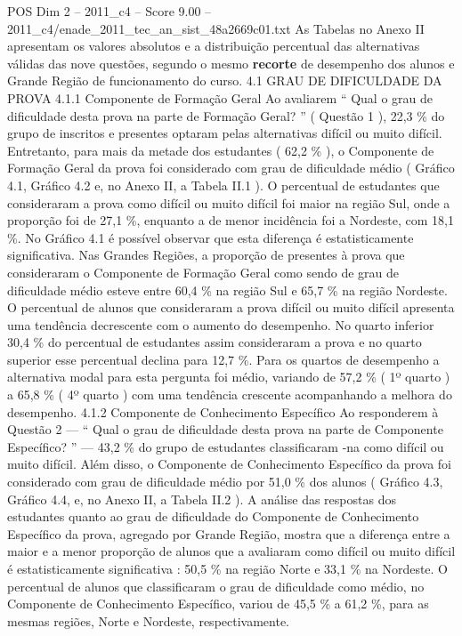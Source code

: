 \begin{textsample}{POS Dim 2 – 2011\_c4 – Score 9.00 – 2011\_c4/enade\_2011\_tec\_an\_sist\_48a2669c01.txt}
As Tabelas no Anexo II apresentam os valores absolutos e a distribuição percentual das alternativas válidas das nove questões, segundo o mesmo \textbf{recorte} de desempenho dos alunos e Grande Região de funcionamento do curso. 4.1 GRAU DE DIFICULDADE DA PROVA 4.1.1 Componente de Formação Geral Ao avaliarem “ Qual o grau de dificuldade desta prova na parte de Formação Geral? ” ( Questão 1 ), 22,3 \% do grupo de inscritos e presentes optaram pelas alternativas difícil ou muito difícil.
Entretanto, para mais da metade dos estudantes ( 62,2 \% ), o Componente de Formação Geral da prova foi considerado com grau de dificuldade médio ( Gráfico 4.1, Gráfico 4.2 e, no Anexo II, a Tabela II.1 ).
O percentual de estudantes que consideraram a prova como difícil ou muito difícil foi maior na região Sul, onde a proporção foi de 27,1 \%, enquanto a de menor incidência foi a Nordeste, com 18,1 \%.
No Gráfico 4.1 é possível observar que esta diferença é estatisticamente significativa.
Nas Grandes Regiões, a proporção de presentes à prova que consideraram o Componente de Formação Geral como sendo de grau de dificuldade médio esteve entre 60,4 \% na região Sul e 65,7 \% na região Nordeste.
O percentual de alunos que consideraram a prova difícil ou muito difícil apresenta uma tendência decrescente com o aumento do desempenho.
No quarto inferior 30,4 \% do percentual de estudantes assim consideraram a prova e no quarto superior esse percentual declina para 12,7 \%.
Para os quartos de desempenho a alternativa modal para esta pergunta foi médio, variando de 57,2 \% ( 1º quarto ) a 65,8 \% ( 4º quarto ) com uma tendência crescente acompanhando a melhora do desempenho. 4.1.2 Componente de Conhecimento Específico Ao responderem à Questão 2 — “ Qual o grau de dificuldade desta prova na parte de Componente Específico? ” — 43,2 \% do grupo de estudantes classificaram -na como difícil ou muito difícil.
Além disso, o Componente de Conhecimento Específico da prova foi considerado com grau de dificuldade médio por 51,0 \% dos alunos ( Gráfico 4.3, Gráfico 4.4, e, no Anexo II, a Tabela II.2 ).
A análise das respostas dos estudantes quanto ao grau de dificuldade do Componente de Conhecimento Específico da prova, agregado por Grande Região, mostra que a diferença entre a maior e a menor proporção de alunos que a avaliaram como difícil ou muito difícil é estatisticamente significativa : 50,5 \% na região Norte e 33,1 \% na Nordeste.
O percentual de alunos que classificaram o grau de dificuldade como médio, no Componente de Conhecimento Específico, variou de 45,5 \% a 61,2 \%, para as mesmas regiões, Norte e Nordeste, respectivamente.

\end{textsample}
